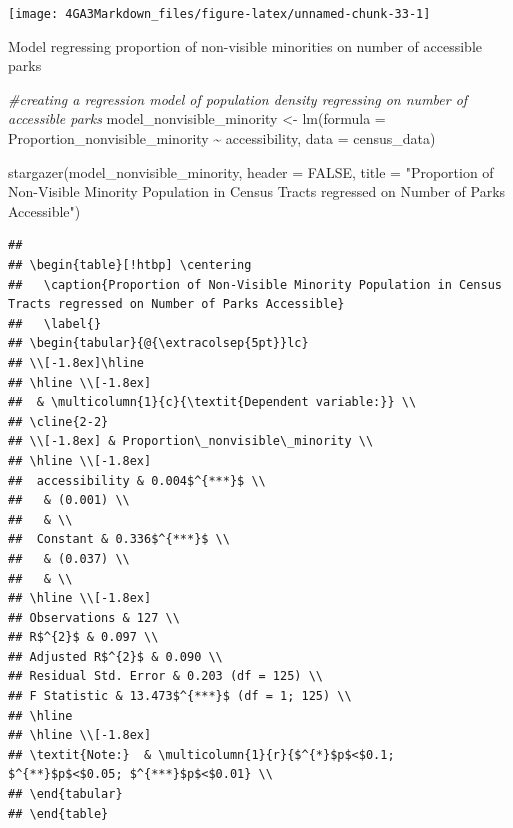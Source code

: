 \documentclass[
]{article}
\newenvironment{Shaded}{\begin{snugshade}}{\end{snugshade}}
\newcommand{\AttributeTok}[1]{\textcolor[rgb]{0.77,0.63,0.00}{#1}}
\newcommand{\CommentTok}[1]{\textcolor[rgb]{0.56,0.35,0.01}{\textit{#1}}}
\newcommand{\ConstantTok}[1]{\textcolor[rgb]{0.00,0.00,0.00}{#1}}
\newcommand{\FunctionTok}[1]{\textcolor[rgb]{0.00,0.00,0.00}{#1}}
\newcommand{\NormalTok}[1]{#1}
\newcommand{\OtherTok}[1]{\textcolor[rgb]{0.56,0.35,0.01}{#1}}
\newcommand{\SpecialCharTok}[1]{\textcolor[rgb]{0.00,0.00,0.00}{#1}}
\newcommand{\StringTok}[1]{\textcolor[rgb]{0.31,0.60,0.02}{#1}}
\begin{document}
\begin{center}\texttt{[image: 4GA3Markdown\_files/figure-latex/unnamed-chunk-33-1]} \end{center}

Model regressing proportion of non-visible minorities on number of
accessible parks

\begin{Shaded}
\begin{Highlighting}[]
\CommentTok{\#creating a regression model of population density regressing on number of accessible parks}
\NormalTok{model\_nonvisible\_minority }\OtherTok{\textless{}{-}} \FunctionTok{lm}\NormalTok{(}\AttributeTok{formula =}\NormalTok{ Proportion\_nonvisible\_minority }\SpecialCharTok{\textasciitilde{}}\NormalTok{ accessibility, }
             \AttributeTok{data =}\NormalTok{ census\_data)}

\FunctionTok{stargazer}\NormalTok{(model\_nonvisible\_minority,}
          \AttributeTok{header =} \ConstantTok{FALSE}\NormalTok{,}
          \AttributeTok{title =} \StringTok{"Proportion of Non{-}Visible Minority Population in Census Tracts regressed on Number of Parks Accessible"}\NormalTok{)}
\end{Highlighting}
\end{Shaded}

\begin{verbatim}
## 
## \begin{table}[!htbp] \centering 
##   \caption{Proportion of Non-Visible Minority Population in Census Tracts regressed on Number of Parks Accessible} 
##   \label{} 
## \begin{tabular}{@{\extracolsep{5pt}}lc} 
## \\[-1.8ex]\hline 
## \hline \\[-1.8ex] 
##  & \multicolumn{1}{c}{\textit{Dependent variable:}} \\ 
## \cline{2-2} 
## \\[-1.8ex] & Proportion\_nonvisible\_minority \\ 
## \hline \\[-1.8ex] 
##  accessibility & 0.004$^{***}$ \\ 
##   & (0.001) \\ 
##   & \\ 
##  Constant & 0.336$^{***}$ \\ 
##   & (0.037) \\ 
##   & \\ 
## \hline \\[-1.8ex] 
## Observations & 127 \\ 
## R$^{2}$ & 0.097 \\ 
## Adjusted R$^{2}$ & 0.090 \\ 
## Residual Std. Error & 0.203 (df = 125) \\ 
## F Statistic & 13.473$^{***}$ (df = 1; 125) \\ 
## \hline 
## \hline \\[-1.8ex] 
## \textit{Note:}  & \multicolumn{1}{r}{$^{*}$p$<$0.1; $^{**}$p$<$0.05; $^{***}$p$<$0.01} \\ 
## \end{tabular} 
## \end{table}
\end{verbatim}
\end{document}
